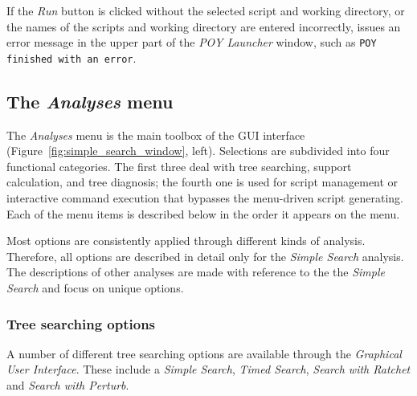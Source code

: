 If the \emph{Run} button is clicked without the selected script and
working directory, or the names of the scripts and working directory are entered incorrectly, \poy issues an
error message in the upper part of the \emph{POY Launcher} window,
such as \texttt{POY finished with an error}. %

\subsection{The \emph{Analyses} menu}
The \emph{Analyses} menu is the main toolbox of the \poy GUI interface (Figure~\ref{fig:simple_search_window}, left). Selections are subdivided into four functional categories. The first three deal with tree searching, support calculation, and tree diagnosis; the fourth one is used for  script management or interactive command execution that bypasses the menu-driven script generating. Each of the menu items is described below in the order it appears on the menu.

Most options are consistently applied through different kinds of analysis. Therefore, all options are described in detail only for the \emph{Simple Search} analysis. The descriptions of other analyses are made with reference to the the \emph{Simple Search} and focus on unique options.


\subsubsection{Tree searching options}

A number of different tree searching options are available through the \emph{Graphical User Interface}.  These include a \emph{Simple Search}, \emph{Timed Search}, \emph{Search with Ratchet} and \emph{Search with Perturb}.

